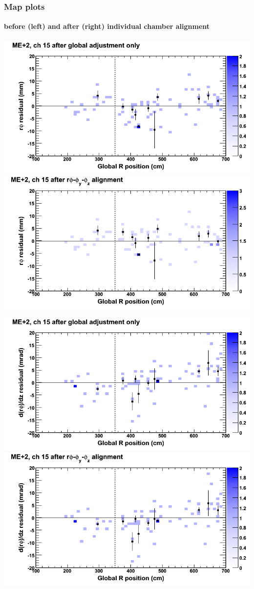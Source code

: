 \documentclass[compress]{beamer}
\begin{document}
\begin{frame}
\frametitle{Map plots}
\framesubtitle{before (left) and after (right) individual chamber alignment}
\includegraphics[width=0.5\linewidth]{ringmapplots_3dof/before_CSCvsr_mep2ch15_x.png} \includegraphics[width=0.5\linewidth]{ringmapplots_3dof/after_CSCvsr_mep2ch15_x.png}

\includegraphics[width=0.5\linewidth]{ringmapplots_3dof/before_CSCvsr_mep2ch15_dxdz.png} \includegraphics[width=0.5\linewidth]{ringmapplots_3dof/after_CSCvsr_mep2ch15_dxdz.png}
\end{frame}
\end{document}
